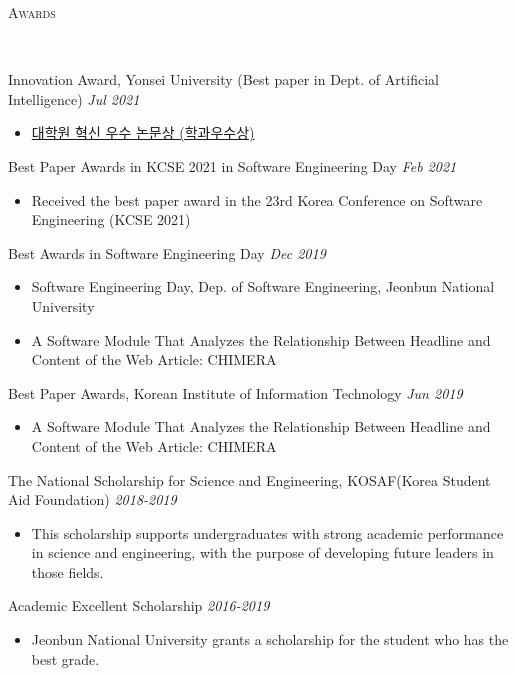 \documentclass[10pt]{article}
\newenvironment{changemargin}[2]{
  \begin{list}{}{
    \setlength{\topsep}{0pt}
    \setlength{\leftmargin}{#1}
    \setlength{\rightmargin}{#2}
    \setlength{\listparindent}{\parindent}
    \setlength{\itemindent}{\parindent}
    \setlength{\parsep}{\parskip}
  }
  \item[]}{\end{list}
}
\newcommand{\lineover}{
	\begin{changemargin}{-0.05in}{-0.05in}
		\vspace*{-8pt}
		\hrulefill \\
		\vspace*{-2pt}
	\end{changemargin}
}
\newcommand{\header}[1]{
	\begin{changemargin}{-0.5in}{-0.5in}
		\scshape{#1}\\
  	\lineover
	\end{changemargin}
}
\newcommand{\award}[2]{
	{#1} \hfill \emph{#2}\\ \medskip
}
\newenvironment{body} {
	\vspace*{-16pt}
	\begin{changemargin}{-0.25in}{-0.5in}
  }
	{\end{changemargin}
}
\begin{document}

\header{Awards}

\begin{body}
	\vspace{14pt}

\award{Innovation Award, Yonsei University (Best paper in Dept. of Artificial Intelligence)}{Jul 2021}
	\begin{itemize} \itemsep -0pt  %
		\item \href{https://www.yonsei.ac.kr/ocx/news.jsp?mode=view&ar_seq=20220708141917269049&sr_volume=632&list_mode=list&sr_site=S&pager.offset=0&sr_cates=29}{대학원 혁신 우수 논문상 (학과우수상)}
  	\end{itemize}
\award{Best Paper Awards in KCSE 2021 in Software Engineering Day}{Feb 2021}
	\begin{itemize} \itemsep -0pt  %
		\item Received the best paper award in the 23rd Korea Conference on Software Engineering (KCSE 2021)
  	\end{itemize}
\award{Best Awards in Software Engineering Day}{Dec 2019}
	\begin{itemize} \itemsep -0pt  %
		\item Software Engineering Day, Dep. of Software Engineering, Jeonbun National University
		\item A Software Module That Analyzes the Relationship Between Headline and Content of the Web Article: CHIMERA
  	\end{itemize}
\award{Best Paper Awards, Korean Institute of Information Technology}{Jun 2019}
	\begin{itemize} \itemsep -0pt  %
		\item A Software Module That Analyzes the Relationship Between Headline and Content of the Web Article: CHIMERA
  	\end{itemize}
\award{The National Scholarship for Science and Engineering, KOSAF(Korea Student Aid Foundation)}{2018-2019}
    \begin{itemize} \itemsep -0pt  %
      \item This scholarship supports undergraduates with strong academic performance in science and engineering, with the purpose of developing future leaders in those fields.
  	\end{itemize}
\award{Academic Excellent Scholarship}{2016-2019}
    \begin{itemize} \itemsep -0pt  %
      \item Jeonbun National University grants a scholarship for the student who has the best grade.
  	\end{itemize}

\end{body}
\end{document}
